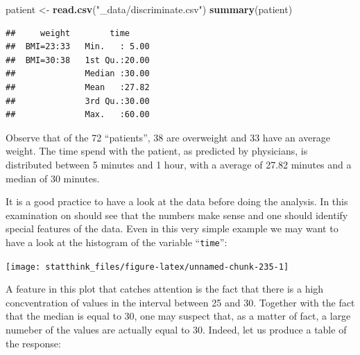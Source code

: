 \documentclass[
]{krantz}
\makeatletter
\newenvironment{Shaded}{\begin{snugshade}}{\end{snugshade}}
\newcommand{\KeywordTok}[1]{\textcolor[rgb]{0.13,0.29,0.53}{\textbf{#1}}}
\newcommand{\NormalTok}[1]{#1}
\newcommand{\OperatorTok}[1]{\textcolor[rgb]{0.81,0.36,0.00}{\textbf{#1}}}
\newcommand{\StringTok}[1]{\textcolor[rgb]{0.31,0.60,0.02}{#1}}
\newenvironment{kframe}{%
\medskip{}
\setlength{\fboxsep}{.8em}
 \def\at@end@of@kframe{}%
 \ifinner\ifhmode%
  \def\at@end@of@kframe{\end{minipage}}%
  \begin{minipage}{\columnwidth}%
 \fi\fi%
 \def\FrameCommand##1{\hskip\@totalleftmargin \hskip-\fboxsep
 \colorbox{shadecolor}{##1}\hskip-\fboxsep
     \hskip-\linewidth \hskip-\@totalleftmargin \hskip\columnwidth}%
 \MakeFramed {\advance\hsize-\width
   \@totalleftmargin\z@ \linewidth\hsize
   \@setminipage}}%
 {\par\unskip\endMakeFramed%
 \at@end@of@kframe}
\renewenvironment{Shaded}{\begin{kframe}}{\end{kframe}}
\theoremstyle{definition}
\theoremstyle{definition}
\theoremstyle{definition}
\theoremstyle{remark}
\makeatother
\begin{document}
\begin{Shaded}
\begin{Highlighting}[]
\NormalTok{patient <-}\StringTok{ }\KeywordTok{read.csv}\NormalTok{(}\StringTok{"_data/discriminate.csv"}\NormalTok{)}
\KeywordTok{summary}\NormalTok{(patient)}
\end{Highlighting}
\end{Shaded}

\begin{verbatim}
##     weight        time      
##  BMI=23:33   Min.   : 5.00  
##  BMI=30:38   1st Qu.:20.00  
##              Median :30.00  
##              Mean   :27.82  
##              3rd Qu.:30.00  
##              Max.   :60.00
\end{verbatim}

Observe that of the 72 ``patients'', 38 are overweight and 33 have an
average weight. The time spend with the patient, as predicted by
physicians, is distributed between 5 minutes and 1 hour, with a average
of 27.82 minutes and a median of 30 minutes.

It is a good practice to have a look at the data before doing the
analysis. In this examination on should see that the numbers make sense
and one should identify special features of the data. Even in this very
simple example we may want to have a look at the histogram of the
variable ``\texttt{time}'':

\begin{Shaded}
\end{Shaded}

\begin{center}\texttt{[image: statthink\_files/figure-latex/unnamed-chunk-235-1]} \end{center}

A feature in this plot that catches
attention is the fact that there is a high concventration of values in
the interval between 25 and 30. Together with the fact that the median
is equal to 30, one may suspect that, as a matter of fact, a large
numeber of the values are actually equal to 30. Indeed, let us produce a
table of the response:

\begin{Shaded}
\end{Shaded}
\end{document}

